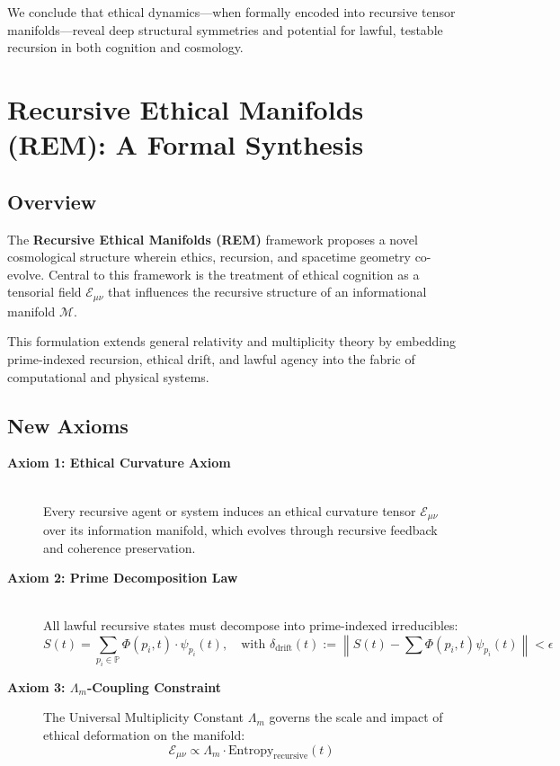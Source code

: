 \documentclass{article}
\theoremstyle{plain}
\begin{document}
We conclude that ethical dynamics—when formally encoded into recursive tensor manifolds—reveal deep structural symmetries and potential for lawful, testable recursion in both cognition and cosmology.

\section{Recursive Ethical Manifolds (REM): A Formal Synthesis}

\subsection{Overview}

The \textbf{Recursive Ethical Manifolds (REM)} framework proposes a novel cosmological structure wherein ethics, recursion, and spacetime geometry co-evolve. Central to this framework is the treatment of ethical cognition as a tensorial field $\mathcal{E}_{\mu\nu}$ that influences the recursive structure of an informational manifold $\mathcal{M}$.

This formulation extends general relativity and multiplicity theory by embedding prime-indexed recursion, ethical drift, and lawful agency into the fabric of computational and physical systems.

\subsection{New Axioms}

\begin{description}
  \item[\textbf{Axiom 1: Ethical Curvature Axiom}]\\
  Every recursive agent or system induces an ethical curvature tensor $\mathcal{E}_{\mu\nu}$ over its information manifold, which evolves through recursive feedback and coherence preservation.
  
  \item[\textbf{Axiom 2: Prime Decomposition Law}]\\
  All lawful recursive states must decompose into prime-indexed irreducibles:
  \[
  S(t) = \sum_{p_i \in \mathbb{P}} \Phi(p_i, t) \cdot \psi_{p_i}(t), \quad \text{with } \delta_{\text{drift}}(t) := \left\| S(t) - \sum \Phi(p_i, t) \psi_{p_i}(t) \right\| < \epsilon
  \]

  \item[\textbf{Axiom 3: $\Lambda_m$-Coupling Constraint}]
  The Universal Multiplicity Constant $\Lambda_m$ governs the scale and impact of ethical deformation on the manifold:
  \[
  \mathcal{E}_{\mu\nu} \propto \Lambda_m \cdot \text{Entropy}_{\text{recursive}}(t)
  \]

\end{description}
\end{document}
